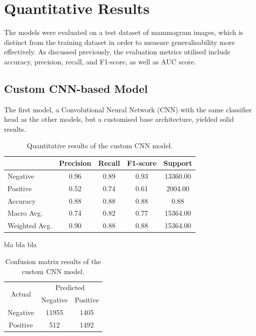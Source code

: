 \documentclass[../main]{subfiles}
\begin{document}
\section{Quantitative Results}
\label{sec:quantitative-results}
The models were evaluated on a test dataset of mammogram images, which is distinct from the training dataset in order to measure generalisability more effectively. As discussed previously, the evaluation metrics utilised include accuracy, precision, recall, and F1-score, as well as AUC score.

\subsection{Custom CNN-based Model}
The first model, a Convolutional Neural Network (CNN) with the same classifier head as the other models, but a customised base architecture, yielded solid results.

\begin{table}[h]
    \centering
    \begin{tabular}{|l|c|c|c|c|}
        \hline
         & Precision & Recall & F1-score & Support \\ \hline
        Negative & 0.96 & 0.89 & 0.93 & 13360.00 \\ \hline
        Positive & 0.52 & 0.74 & 0.61 & 2004.00 \\ \hline
        Accuracy & 0.88 & 0.88 & 0.88 & 0.88 \\ \hline
        Macro Avg. & 0.74 & 0.82 & 0.77 & 15364.00 \\ \hline
        Weighted Avg. & 0.90 & 0.88 & 0.88 & 15364.00 \\ \hline
    \end{tabular}
    \caption{Quantitative results of the custom CNN model.}
    \label{tab:quantitative-results-custom-cnn}
\end{table}

\noindent bla bla bla

\begin{table}[h]
    \centering
    \begin{tabular}{|c|c|c|}
        \hline
        \multirow{2}{*}{Actual} & \multicolumn{2}{c|}{Predicted} \\ \cline{2-3}
                                & Negative         & Positive         \\ \hline
        Negative                & 11955            & 1405              \\ \hline
        Positive                & 512              & 1492              \\ \hline
    \end{tabular}
    \caption{Confusion matrix results of the custom CNN model.}
    \label{tab:confusion-matrix-custom-cnn}
\end{table}
\end{document}
